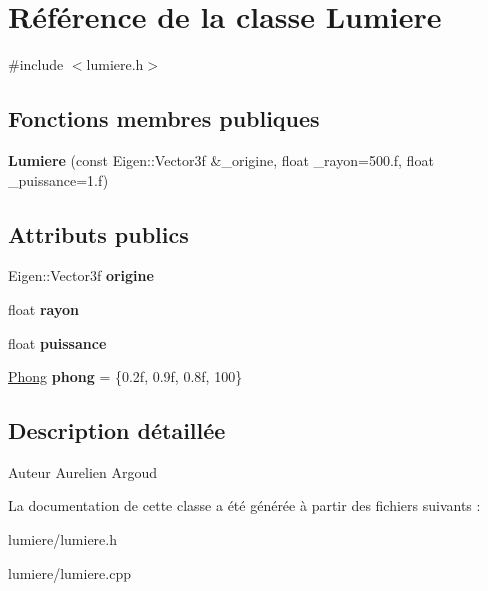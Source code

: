 \hypertarget{class_lumiere}{}\section{Référence de la classe Lumiere}
\label{class_lumiere}


{\ttfamily \#include $<$lumiere.\+h$>$}

\subsection*{Fonctions membres publiques}
\begin{DoxyCompactItemize}
\item 
\hypertarget{class_lumiere_a5425b244617e0940ea15ca57b44a6bfc}{}{\bfseries Lumiere} (const Eigen\+::\+Vector3f \&\+\_\+origine, float \+\_\+rayon=500.f, float \+\_\+puissance=1.f)\label{class_lumiere_a5425b244617e0940ea15ca57b44a6bfc}

\end{DoxyCompactItemize}
\subsection*{Attributs publics}
\begin{DoxyCompactItemize}
\item 
\hypertarget{class_lumiere_ab8142585162294560ab9598e9e2dd78a}{}Eigen\+::\+Vector3f {\bfseries origine}\label{class_lumiere_ab8142585162294560ab9598e9e2dd78a}

\item 
\hypertarget{class_lumiere_ac351fa40771c5f8e8366e7d91fa214f4}{}float {\bfseries rayon}\label{class_lumiere_ac351fa40771c5f8e8366e7d91fa214f4}

\item 
\hypertarget{class_lumiere_ac03697f99db8693398231bed7fd9a673}{}float {\bfseries puissance}\label{class_lumiere_ac03697f99db8693398231bed7fd9a673}

\item 
\hypertarget{class_lumiere_a01061e09d284ae42d6aafacdab2e269b}{}\hyperlink{struct_phong}{Phong} {\bfseries phong} = \{0.\+2f, 0.\+9f, 0.\+8f, 100\}\label{class_lumiere_a01061e09d284ae42d6aafacdab2e269b}

\end{DoxyCompactItemize}


\subsection{Description détaillée}
\begin{DoxyAuthor}{Auteur}
Aurelien Argoud 
\end{DoxyAuthor}


La documentation de cette classe a été générée à partir des fichiers suivants \+:\begin{DoxyCompactItemize}
\item 
lumiere/lumiere.\+h\item 
lumiere/lumiere.\+cpp\end{DoxyCompactItemize}
